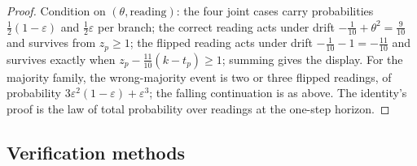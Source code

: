 \documentclass[10pt,twocolumn]{article}
\theoremstyle{plain}
\theoremstyle{definition}
\theoremstyle{remark}
\begin{document}
\begin{proof}
Condition on \((\theta, \text{reading})\): the four joint cases carry
probabilities \(\tfrac12(1-\varepsilon)\) and \(\tfrac12\varepsilon\)
per branch; the correct reading acts under drift
\(-\tfrac1{10} + \theta^{2} = \tfrac9{10}\) and survives from
\(z_{p} \ge 1\); the flipped reading acts under drift
\(-\tfrac1{10} - 1 = -\tfrac{11}{10}\) and survives exactly when
\(z_{p} - \tfrac{11}{10}(k - t_{p}) \ge 1\); summing gives the
display. For the majority family, the wrong-majority event is two or
three flipped readings, of probability
\(3\varepsilon^{2}(1-\varepsilon) + \varepsilon^{3}\); the falling
continuation is as above. The identity's proof is the law of total
probability over readings at the one-step horizon.
\end{proof}

\subsection{Verification methods}\label{methods}
\end{document}
